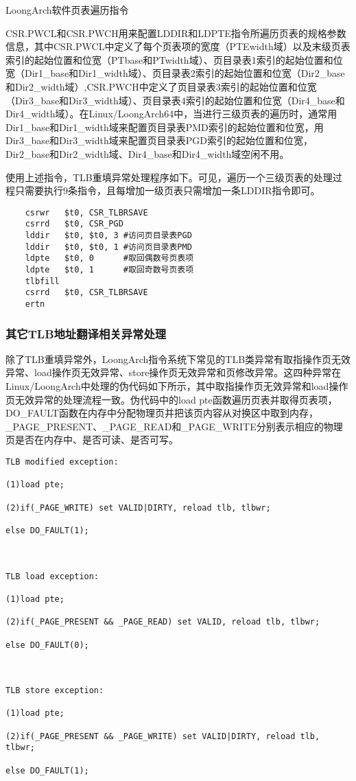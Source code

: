 \documentclass[]{ctexbook}
\begin{document}
\label{tab:lddir-ldpte}LoongArch软件页表遍历指令

CSR.PWCL和CSR.PWCH用来配置LDDIR和LDPTE指令所遍历页表的规格参数信息，其中CSR.PWCL中定义了每个页表项的宽度（PTEwidth域）以及末级页表索引的起始位置和位宽（PTbase和PTwidth域）、页目录表1索引的起始位置和位宽（Dir1\_base和Dir1\_width域）、页目录表2索引的起始位置和位宽（Dir2\_base和Dir2\_width域）,CSR.PWCH中定义了页目录表3索引的起始位置和位宽（Dir3\_base和Dir3\_width域）、页目录表4索引的起始位置和位宽（Dir4\_base和Dir4\_width域）。在Linux/LoongArch64中，当进行三级页表的遍历时，通常用Dir1\_base和Dir1\_width域来配置页目录表PMD索引的起始位置和位宽，用Dir3\_base和Dir3\_width域来配置页目录表PGD索引的起始位置和位宽，Dir2\_base和Dir2\_width域、Dir4\_base和Dir4\_width域空闲不用。

使用上述指令，TLB重填异常处理程序如下。可见，遍历一个三级页表的处理过程只需要执行9条指令，且每增加一级页表只需增加一条LDDIR指令即可。

\begin{verbatim}
    csrwr   $t0, CSR_TLBRSAVE
    csrrd   $t0, CSR_PGD
    lddir   $t0, $t0, 3 #访问页目录表PGD
    lddir   $t0, $t0, 1 #访问页目录表PMD
    ldpte   $t0, 0      #取回偶数号页表项
    ldpte   $t0, 1      #取回奇数号页表项
    tlbfill
    csrrd   $t0, CSR_TLBRSAVE
    ertn
\end{verbatim}

\hypertarget{ux5176ux5b83tlbux5730ux5740ux7ffbux8bd1ux76f8ux5173ux5f02ux5e38ux5904ux7406}{%
\subsubsection{其它TLB地址翻译相关异常处理}\label{ux5176ux5b83tlbux5730ux5740ux7ffbux8bd1ux76f8ux5173ux5f02ux5e38ux5904ux7406}}

除了TLB重填异常外，LoongArch指令系统下常见的TLB类异常有取指操作页无效异常、load操作页无效异常、store操作页无效异常和页修改异常。这四种异常在Linux/LoongArch中处理的伪代码如下所示，其中取指操作页无效异常和load操作页无效异常的处理流程一致。伪代码中的load pte函数遍历页表并取得页表项，DO\_FAULT函数在内存中分配物理页并把该页内容从对换区中取到内存，\_PAGE\_PRESENT、\_PAGE\_READ和\_PAGE\_WRITE分别表示相应的物理页是否在内存中、是否可读、是否可写。

\begin{verbatim}
TLB modified exception:

(1)load pte;

(2)if(_PAGE_WRITE) set VALID|DIRTY, reload tlb, tlbwr;

else DO_FAULT(1);



TLB load exception:

(1)load pte;

(2)if(_PAGE_PRESENT && _PAGE_READ) set VALID, reload tlb, tlbwr;

else DO_FAULT(0);



TLB store exception:

(1)load pte;

(2)if(_PAGE_PRESENT && _PAGE_WRITE) set VALID|DIRTY, reload tlb, tlbwr;

else DO_FAULT(1);
\end{verbatim}
\end{document}

